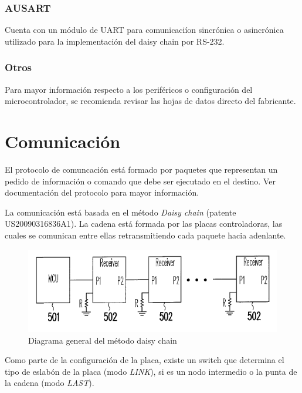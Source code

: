 \documentclass[a4paper,10pt]{article}
\begin{document}
\subsubsection{AUSART}
\label{ausart}

Cuenta con un m\'odulo de UART para comunicaci\'ion sincr\'onica o asincr\'onica utilizado para la implementaci\'on del daisy chain por RS-232.

\subsubsection{Otros}
\label{otros}

Para mayor informaci\'on respecto a los perif\'ericos o configuraci\'on del microcontrolador, se recomienda revisar las hojas de datos directo del fabricante.

\section{Comunicaci\'on}
\label{comunicacion}

	El protocolo de comuncaci\'on est\'a formado por paquetes que representan un pedido de informaci\'on o comando que debe ser ejecutado en el destino.
Ver documentaci\'on del protocolo para mayor informaci\'on.

La comunicaci\'on est\'a basada en el m\'etodo \emph{Daisy chain} (patente US20090316836A1).
La cadena est\'a formada por las placas controladoras, las cuales se comunican entre ellas retransmitiendo cada paquete hacia adenlante.

\begin{figure}
\centering
\includegraphics[scale=.5]{daisychain_diagram.png}
\caption{Diagrama general del m\'etodo daisy chain}
\label{daisychain_diagram}
\end{figure}

Como parte de la configuraci\'on de la placa, existe un switch que determina el tipo de eslab\'on de la placa (modo \emph{LINK}), si es un nodo intermedio
o la punta de la cadena (modo \emph{LAST}).
\end{document}
